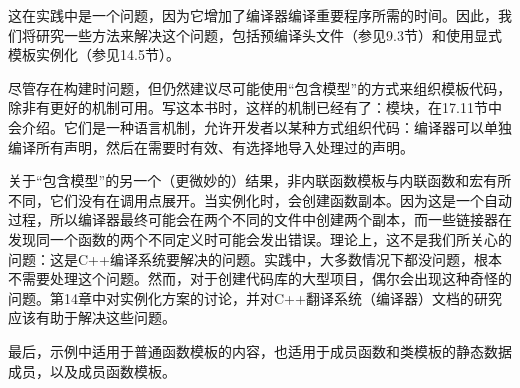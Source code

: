 这在实践中是一个问题，因为它增加了编译器编译重要程序所需的时间。因此，我们将研究一些方法来解决这个问题，包括预编译头文件（参见9.3节）和使用显式模板实例化（参见14.5节）。

尽管存在构建时问题，但仍然建议尽可能使用“包含模型”的方式来组织模板代码，除非有更好的机制可用。写这本书时，这样的机制已经有了：模块，在17.11节中会介绍。它们是一种语言机制，允许开发者以某种方式组织代码：编译器可以单独编译所有声明，然后在需要时有效、有选择地导入处理过的声明。

关于“包含模型”的另一个（更微妙的）结果，非内联函数模板与内联函数和宏有所不同，它们没有在调用点展开。当实例化时，会创建函数副本。因为这是一个自动过程，所以编译器最终可能会在两个不同的文件中创建两个副本，而一些链接器在发现同一个函数的两个不同定义时可能会发出错误。理论上，这不是我们所关心的问题：这是C++编译系统要解决的问题。实践中，大多数情况下都没问题，根本不需要处理这个问题。然而，对于创建代码库的大型项目，偶尔会出现这种奇怪的问题。第14章中对实例化方案的讨论，并对C++翻译系统（编译器）文档的研究应该有助于解决这些问题。

最后，示例中适用于普通函数模板的内容，也适用于成员函数和类模板的静态数据成员，以及成员函数模板。












